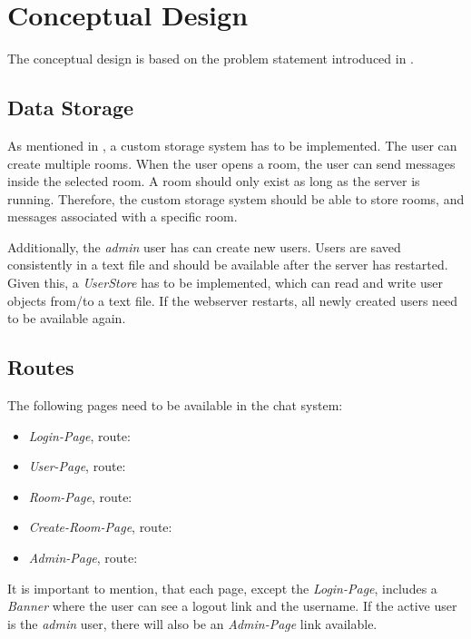 \section{Conceptual Design}\label{sec:02_design}
The conceptual design is based on the problem statement introduced in .


\subsection{Data Storage}\label{subsec:02_design_datastorage}
As mentioned in , a custom storage system has to be implemented.
The user can create multiple rooms. When the user opens a room, the user can send messages inside the selected room. A room should only exist as long as the server is running. Therefore, the custom storage system should be able to store rooms, and messages associated with a specific room.

Additionally, the \textit{admin} user has can create new users. Users are saved consistently in a text file and should be available after the server has restarted.
Given this, a \textit{UserStore} has to be implemented, which can read and write user objects from/to a text file. If the webserver restarts, all newly created users need to be available again.


\subsection{Routes}\label{subsec:02_design_routes}
The following pages need to be available in the chat system:
\begin{itemize}
\item \textit{Login-Page}, route: 
\item \textit{User-Page}, route: 
\item \textit{Room-Page}, route: 
\item \textit{Create-Room-Page}, route: 
\item \textit{Admin-Page}, route: 
\end{itemize}

It is important to mention, that each page, except the \textit{Login-Page}, includes a \textit{Banner} where the user can see a logout link and the username. If the active user is the \textit{admin} user, there will also be an \textit{Admin-Page} link available.

